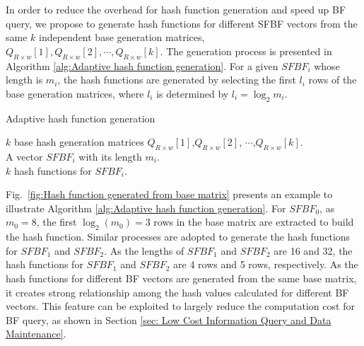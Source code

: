 \documentclass[10pt,journal,compsoc]{IEEEtran}
\begin{document}


In order to reduce the overhead for hash function generation and speed up BF query, we propose to generate hash functions for different SFBF vectors from the same $k$ independent base generation matrices, ${Q_{R \times w}}[1],{Q_{R \times w}}[2], \cdots ,{Q_{R \times w}}[k]$. The generation process is presented in Algorithm \ref{alg:Adaptive hash function generation}. For a given $SFBF_i$ whose length is $m_i$, the hash functions are generated by selecting the first $l_i$ rows of the base generation matrices, where $l_i$ is determined by $l_i = {\log _2}{m_i}$.








\begin{algorithm}[h]
\caption{Adaptive hash function generation}
\label{alg:Adaptive hash function generation}
\begin{algorithmic}[1]
\small
\REQUIRE
$k$ base hash generation matrices ${Q_{R \times w}}[1]$,${Q_{R \times w}}[2]$, $\cdots$,${Q_{R \times w}}[k]$. \\
A vector $SFBF_i$ with its length $m_i$.\\
\ENSURE
$k$ hash functions for $SFBF_i$.\\

\end{algorithmic}
\end{algorithm}

Fig.~\ref{fig:Hash function generated from base matrix} presents an example to illustrate Algorithm \ref{alg:Adaptive hash function generation}. For $SFBF_0$, as $m_0=8$, the first ${\log _2}\left( {{m_0}} \right)=3$ rows in the base matrix are extracted to build the hash function. Similar processes are adopted to generate the hash functions for $SFBF_1$ and $SFBF_2$. As the lengths of $SFBF_1$ and $SFBF_2$ are 16 and 32, the hash functions for $SFBF_1$ and $SFBF_2$ are 4 rows and 5 rows, respectively.  As the hash functions for different BF vectors are generated from the same base matrix, it creates strong relationship among the hash values calculated for different BF vectors. This feature can be exploited to largely reduce the computation cost for BF query, as shown in Section \ref{sec: Low Cost Information Query and Data Maintenance}.
\end{document}

